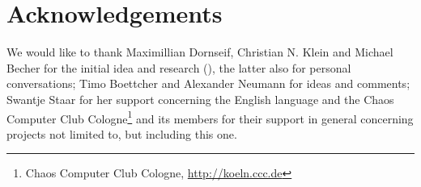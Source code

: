 %
%

\section{Acknowledgements}

We would like to thank Maximillian Dornseif, Christian N. Klein and Michael
Becher for the initial idea and research (\cite{cansecwest_firewire:2005}), the
latter also for personal conversations; %
Timo Boettcher and Alexander Neumann for ideas and comments; Swantje Staar for
her support concerning the English language and the Chaos Computer Club
Cologne\footnote{Chaos Computer Club Cologne,
\href{http://koeln.ccc.de}{http://koeln.ccc.de}} and its members for their
support in general concerning projects not limited to, but including this one.

